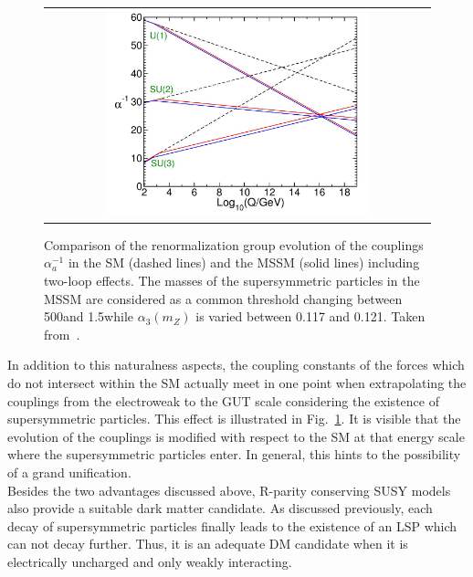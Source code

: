 \begin{figure}[!tp]
  \centering
  \begin{tabular}{c}
    \includegraphics[width=0.7\textwidth]{figures/Couplings.jpg}
  \end{tabular}
  \caption{Comparison of the renormalization group evolution of the couplings $\alpha_{a}^{-1}$ in the SM (dashed lines) and the MSSM (solid lines) including two-loop effects. The masses of the supersymmetric particles in the MSSM are considered as a common threshold changing between 500\gev and 1.5\tev while $\alpha_{3}(m_{Z})$ is varied between 0.117 and 0.121. Taken from~\cite{Martin:1997ns}.}
  \label{fig:couplings}
\end{figure}
In addition to this naturalness aspects, the coupling constants of the forces which do not intersect within the SM actually meet in one point when extrapolating the couplings from the electroweak to the GUT scale considering the existence of supersymmetric particles. This effect is illustrated in Fig.~\ref{fig:couplings}. It is visible that the evolution of the couplings is modified with respect to the SM at that energy scale where the supersymmetric particles enter. In general, this hints to the possibility of a grand unification.\\
Besides the two advantages discussed above, R-parity conserving SUSY models also provide a suitable dark matter candidate. As discussed previously, each decay of supersymmetric particles finally leads to the existence of an LSP which can not decay further. Thus, it is an adequate DM candidate when it is electrically uncharged and only weakly interacting.

